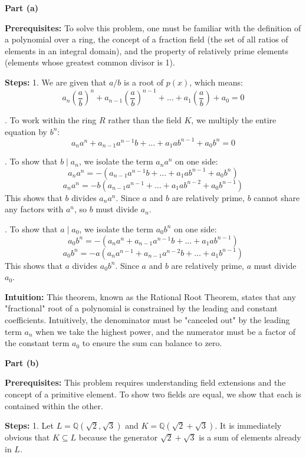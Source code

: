 \begin{solution}
\textbf{Part (a)}

\medskip
\textbf{Prerequisites:}
To solve this problem, one must be familiar with the definition of a polynomial over a ring, the concept of a fraction field (the set of all ratios of elements in an integral domain), and the property of relatively prime elements (elements whose greatest common divisor is 1).

\medskip
\textbf{Steps:}
1. We are given that $a/b$ is a root of $p(x)$, which means:
$$a_n\left(\frac{a}{b}\right)^n + a_{n-1}\left(\frac{a}{b}\right)^{n-1} + \dots + a_1\left(\frac{a}{b}\right) + a_0 = 0$$

. To work within the ring $R$ rather than the field $K$, we multiply the entire equation by $b^n$:
$$a_n a^n + a_{n-1} a^{n-1}b + \dots + a_1 a b^{n-1} + a_0 b^n = 0$$

. To show that $b \mid a_n$, we isolate the term $a_n a^n$ on one side:
$$a_n a^n = -(a_{n-1} a^{n-1}b + \dots + a_1 a b^{n-1} + a_0 b^n)$$
$$a_n a^n = -b(a_{n-1} a^{n-1} + \dots + a_1 a b^{n-2} + a_0 b^{n-1})$$
This shows that $b$ divides $a_n a^n$. Since $a$ and $b$ are relatively prime, $b$ cannot share any factors with $a^n$, so $b$ must divide $a_n$.

. To show that $a \mid a_0$, we isolate the term $a_0 b^n$ on one side:
$$a_0 b^n = -(a_n a^n + a_{n-1} a^{n-1}b + \dots + a_1 a b^{n-1})$$
$$a_0 b^n = -a(a_n a^{n-1} + a_{n-1} a^{n-2}b + \dots + a_1 b^{n-1})$$
This shows that $a$ divides $a_0 b^n$. Since $a$ and $b$ are relatively prime, $a$ must divide $a_0$.

\medskip
\textbf{Intuition:}
This theorem, known as the Rational Root Theorem, states that any "fractional" root of a polynomial is constrained by the leading and constant coefficients. Intuitively, the denominator must be "canceled out" by the leading term $a_n$ when we take the highest power, and the numerator must be a factor of the constant term $a_0$ to ensure the sum can balance to zero.

\bigskip
\textbf{Part (b)}

\medskip
\textbf{Prerequisites:}
This problem requires understanding field extensions and the concept of a primitive element. To show two fields are equal, we show that each is contained within the other.

\medskip
\textbf{Steps:}
1. Let $L = \mathbb{Q}(\sqrt{2}, \sqrt{3})$ and $K = \mathbb{Q}(\sqrt{2} + \sqrt{3})$. It is immediately obvious that $K \subseteq L$ because the generator $\sqrt{2} + \sqrt{3}$ is a sum of elements already in $L$.


\end{solution}
